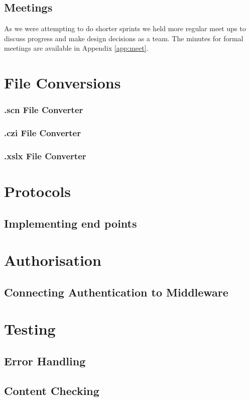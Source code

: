 \documentclass{article}
\begin{document}
\subsection{Meetings}
As we were attempting to do shorter sprints we held more regular meet ups to discuss progress and make design decisions as a team. 
The minutes for formal meetings are available in Appendix \ref{app:meet}.


\section{File Conversions}
\subsubsection{.scn File Converter}
\subsubsection{.czi File Converter}
\subsubsection{.xslx File Converter}


\section{Protocols}
\subsection{Implementing end points}

\section{Authorisation}
\subsection{Connecting Authentication to Middleware}


\section{Testing}
\subsection{Error Handling}
\subsection{Content Checking}
\end{document}
